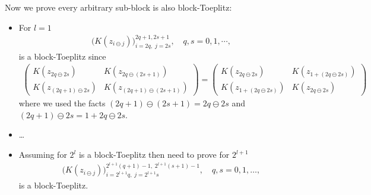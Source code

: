 \documentclass{iitthesis}          %
\begin{document}

\iffalse
Now we prove every arbitrary sub-block is also block-Toeplitz: 
\begin{itemize}
\item For $l=1$
\begin{align*}
\bigl( K(z_{i \ominus j})\bigr)_{i=2q, \; j=2s}^{2q+1, 2s+1}, \quad q,s=0,1,\cdots,
\end{align*}
is a block-Toeplitz since
\begin{align*}
\begin{pmatrix}
K(z_{2q \ominus 2s}) & K(z_{2q \ominus (2s +1)}) \\
K(z_{(2q+1) \ominus 2s}) & K(z_{(2q+1) \ominus (2s +1)}) 
\end{pmatrix}
=
\begin{pmatrix}
K(z_{2q \ominus 2s}) & K(z_{1 + (2q \ominus 2s)}) \\
K(z_{1 + (2q \ominus 2s)}) & K(z_{ 2q \ominus 2s}) 
\end{pmatrix}
\end{align*}
where we used the facts $(2q+1) \ominus (2s+1) = 2q \ominus 2s$ and $(2q+1) \ominus 2s = 1 + 2q \ominus 2s$.

\item \ldots

\item Assuming for $2^{l}$ is a block-Toeplitz then need to prove for $2^{l+1}$ 
\begin{align*}
\bigl( K(z_{i \ominus j})\bigr)_{i=2^{l+1}q, \; j=2^{l+1}s}^{2^{l+1}(q+1)-1, \; 2^{l+1}(s+1)-1}, \quad q,s=0,1,\dots,
\end{align*}
is a block-Toeplitz.


\end{itemize}
\end{document}
